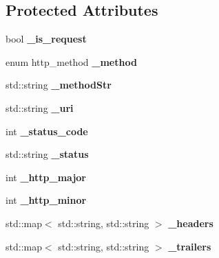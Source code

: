 \subsection*{Protected Attributes}
\begin{DoxyCompactItemize}
\item 
\mbox{\label{class_message_base_a647ba386ca25d115d68f9f3c86beebe8}} 
bool {\bfseries \+\_\+is\+\_\+request}
\item 
\mbox{\label{class_message_base_a093ad4697fd2f03b394085fec74f2054}} 
enum http\+\_\+method {\bfseries \+\_\+method}
\item 
\mbox{\label{class_message_base_a3c5d42001f69414a3bd627b0d1e5606e}} 
std\+::string {\bfseries \+\_\+method\+Str}
\item 
\mbox{\label{class_message_base_a7a830e02b75d652d4602b77ed8afd772}} 
std\+::string {\bfseries \+\_\+uri}
\item 
\mbox{\label{class_message_base_aa967b2e5fcf381851ca4b43aa42fdff6}} 
int {\bfseries \+\_\+status\+\_\+code}
\item 
\mbox{\label{class_message_base_a9f697453b5e4c3d566bf929d7f1f67b3}} 
std\+::string {\bfseries \+\_\+status}
\item 
\mbox{\label{class_message_base_aca700db308fc5b1708e08f40c9fbf2ec}} 
int {\bfseries \+\_\+http\+\_\+major}
\item 
\mbox{\label{class_message_base_a1507173e297eed53eb53c45f52d09054}} 
int {\bfseries \+\_\+http\+\_\+minor}
\item 
\mbox{\label{class_message_base_abc90275b70204447de92d1f20dd755c5}} 
std\+::map$<$ std\+::string, std\+::string $>$ {\bfseries \+\_\+headers}
\item 
\mbox{\label{class_message_base_a322ec7701cd03545071561600050aa5d}} 
std\+::map$<$ std\+::string, std\+::string $>$ {\bfseries \+\_\+trailers}
\end{DoxyCompactItemize}
